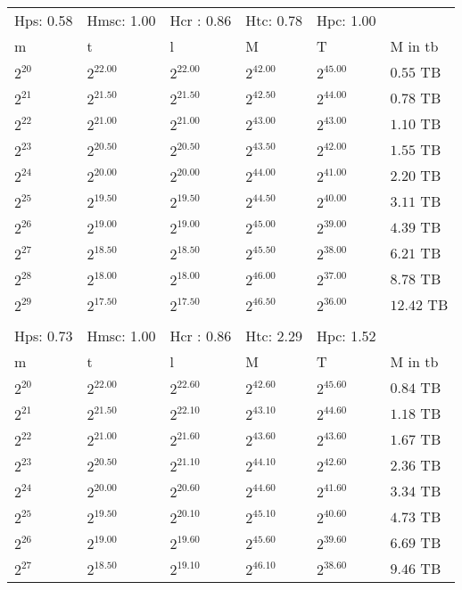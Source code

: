 \documentclass{article}
\begin{document}
\newpage\begin{tabular}{llllll}
Hps: 0.58 & Hmsc: 1.00 & Hcr : 0.86 & Htc: 0.78 & Hpc: 1.00 &  \\
m & t & l & M & T & M in tb \\
$2^{20}$ & $2^{22.00}$ & $2^{22.00}$ & $2^{42.00}$ & $2^{45.00}$ & $0.55$ TB \\
$2^{21}$ & $2^{21.50}$ & $2^{21.50}$ & $2^{42.50}$ & $2^{44.00}$ & $0.78$ TB \\
$2^{22}$ & $2^{21.00}$ & $2^{21.00}$ & $2^{43.00}$ & $2^{43.00}$ & $1.10$ TB \\
$2^{23}$ & $2^{20.50}$ & $2^{20.50}$ & $2^{43.50}$ & $2^{42.00}$ & $1.55$ TB \\
$2^{24}$ & $2^{20.00}$ & $2^{20.00}$ & $2^{44.00}$ & $2^{41.00}$ & $2.20$ TB \\
$2^{25}$ & $2^{19.50}$ & $2^{19.50}$ & $2^{44.50}$ & $2^{40.00}$ & $3.11$ TB \\
$2^{26}$ & $2^{19.00}$ & $2^{19.00}$ & $2^{45.00}$ & $2^{39.00}$ & $4.39$ TB \\
$2^{27}$ & $2^{18.50}$ & $2^{18.50}$ & $2^{45.50}$ & $2^{38.00}$ & $6.21$ TB \\
$2^{28}$ & $2^{18.00}$ & $2^{18.00}$ & $2^{46.00}$ & $2^{37.00}$ & $8.78$ TB \\
$2^{29}$ & $2^{17.50}$ & $2^{17.50}$ & $2^{46.50}$ & $2^{36.00}$ & $12.42$ TB \\
 &  &  &  &  &  \\
Hps: 0.73 & Hmsc: 1.00 & Hcr : 0.86 & Htc: 2.29 & Hpc: 1.52 &  \\
m & t & l & M & T & M in tb \\
$2^{20}$ & $2^{22.00}$ & $2^{22.60}$ & $2^{42.60}$ & $2^{45.60}$ & $0.84$ TB \\
$2^{21}$ & $2^{21.50}$ & $2^{22.10}$ & $2^{43.10}$ & $2^{44.60}$ & $1.18$ TB \\
$2^{22}$ & $2^{21.00}$ & $2^{21.60}$ & $2^{43.60}$ & $2^{43.60}$ & $1.67$ TB \\
$2^{23}$ & $2^{20.50}$ & $2^{21.10}$ & $2^{44.10}$ & $2^{42.60}$ & $2.36$ TB \\
$2^{24}$ & $2^{20.00}$ & $2^{20.60}$ & $2^{44.60}$ & $2^{41.60}$ & $3.34$ TB \\
$2^{25}$ & $2^{19.50}$ & $2^{20.10}$ & $2^{45.10}$ & $2^{40.60}$ & $4.73$ TB \\
$2^{26}$ & $2^{19.00}$ & $2^{19.60}$ & $2^{45.60}$ & $2^{39.60}$ & $6.69$ TB \\
$2^{27}$ & $2^{18.50}$ & $2^{19.10}$ & $2^{46.10}$ & $2^{38.60}$ & $9.46$ TB \\

\end{tabular}
\end{document}
